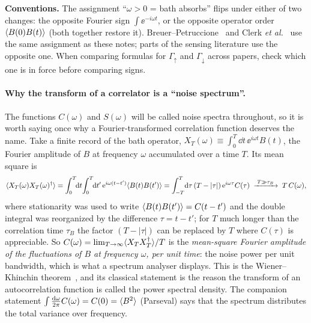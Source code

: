 \begin{warnbox}
\small\textbf{Conventions.}
The assignment ``$\omega>0$ = bath absorbs'' flips under either of two changes: the opposite Fourier sign $\int\ee^{-i\omega t}$, or the opposite operator order $\langle B(0)B(t)\rangle$ (both together restore it).
Breuer--Petruccione~\cite[Sec.~3.3.1]{BreuerPetruccione} and Clerk \emph{et al.}~\cite[Sec.~II.B]{ClerkRMP2010} use the same assignment as these notes; parts of the sensing literature use the opposite one.
When comparing formulas for $\Gamma_\uparrow$ and $\Gamma_\downarrow$ across papers, check which one is in force before comparing signs.
\end{warnbox}

\paragraph{Why the transform of a correlator is a ``noise spectrum''.}
The functions $C(\omega)$ and $S(\omega)$ will be called noise spectra throughout, so it is worth saying once why a Fourier-transformed correlation function deserves the name.
Take a finite record of the bath operator, $X_T(\omega)\equiv\int_0^T\dd t\,\ee^{i\omega t}B(t)$, the Fourier amplitude of $B$ at frequency $\omega$ accumulated over a time $T$.
Its mean square is
\begin{equation}
  \langle X_T(\omega)X_T(\omega)^\dagger\rangle=\int_0^T\!\!\mathrm{d} t\!\int_0^T\!\!\mathrm{d} t'\,\mathrm{e}^{i\omega(t-t')}\langle B(t)B(t')\rangle
  =\int_{-T}^{T}\!\mathrm{d}\tau\,(T-|\tau|)\,\mathrm{e}^{i\omega\tau}C(\tau)\;\xrightarrow{\;T\gg\tau_B\;}\;T\,C(\omega),
  \label{eq:wiener-khinchin}
\end{equation}
where stationarity was used to write $\langle B(t)B(t')\rangle=C(t-t')$ and the double integral was reorganized by the difference $\tau=t-t'$; for $T$ much longer than the correlation time $\tau_B$ the factor $(T-|\tau|)$ can be replaced by $T$ where $C(\tau)$ is appreciable.
So $C(\omega)=\lim_{T\to\infty}\langle X_TX_T^\dagger\rangle/T$ is the \emph{mean-square Fourier amplitude of the fluctuations of $B$ at frequency $\omega$, per unit time}: the noise power per unit bandwidth, which is what a spectrum analyser displays.
This is the Wiener--Khinchin theorem~\cite{Wiener1930,Khinchin1934}, and its classical statement is the reason the transform of an autocorrelation function is called the power spectral density.
The companion statement $\int\frac{\mathrm{d}\omega}{2\pi}C(\omega)=C(0)=\langle B^2\rangle$ (Parseval) says that the spectrum distributes the total variance over frequency.

